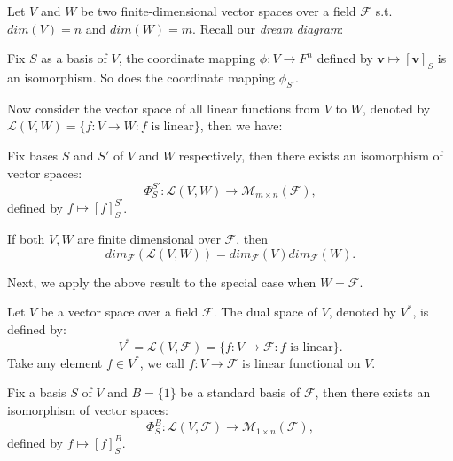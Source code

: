 Let $V$ and $W$ be two finite-dimensional vector spaces over a field $\mathcal{F}$ s.t.
$dim(V)=n$ and $dim(W)=m$. Recall our \emph{dream diagram}:

\begin{center}
\end{center}

Fix $S$ as a basis of $V$, the coordinate mapping $\phi: V\rightarrow F^n$ defined by 
$\mathbf{v} \mapsto [\mathbf{v}]_S$ is an isomorphism. So does the coordinate mapping $\phi_{S'}$.

Now consider the vector space of all linear functions from $V$ to $W$, denoted by $\mathcal{L}(V,W)=\{f:V\rightarrow W: f \text{ is linear}\}$, then we have:
\begin{theorem}
    Fix bases $S$ and $S'$ of $V$ and $W$ respectively, then there exists an isomorphism of vector spaces:
    \[\Phi^{S'}_{S}:\mathcal{L}(V,W)\rightarrow \mathcal{M}_{m\times n}(\mathcal{F}),\]
    defined by $f\mapsto [f]^{S'}_{S}$.
\end{theorem}

\begin{corollary}
    If both $V, W$ are finite dimensional over $\mathcal{F}$, then
    \[dim_\mathcal{F}(\mathcal{L}(V,W))=dim_\mathcal{F}(V)dim_\mathcal{F}(W).\]
\end{corollary}

Next, we apply the above result to the special case when $W=\mathcal{F}$.

\begin{definition}
    Let $V$ be a vector space over a field $\mathcal{F}$. The dual space of $V$, denoted by $V^*$, is defined by:
    \[V^* = \mathcal{L}(V,\mathcal{F})=\{f:V\rightarrow \mathcal{F}: f \text{ is linear}\}.\]
    Take any element $f\in V^*$, we call $f:V\to \mathcal{F}$ is linear functional on $V$.
\end{definition}


\begin{theorem}
    Fix a basis $S$ of $V$ and $B=\{1\}$ be a standard basis of $\mathcal{F}$, then there exists an isomorphism of vector spaces:
    \[\Phi^{B}_{S}:\mathcal{L}(V,\mathcal{F})\rightarrow \mathcal{M}_{1\times n}(\mathcal{F}),\]
    defined by $f\mapsto [f]^{B}_{S}$.
\end{theorem}


